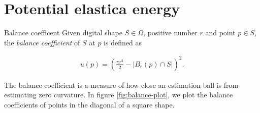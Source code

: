 \chapter{Potential elastica energy}
\label{chapter:appendix-potential-elastica-energy}

\begin{definition}{Balance coefficent}
Given digital shape $S \in \Omega$, positive number $r$ and point $p \in S$, the \emph{balance coefficient} of $S$ at $p$ is defined as

\begin{align*}
	u(p) = \left( \frac{\pi r^2}{2} - |B_r(p) \cap S| \right)^2.
\end{align*}

\end{definition}

The balance coefficient is a measure of how close an estimation ball is from estimating zero curvature. In figure \ref{fig:balance-plot}, we plot the balance coefficients of points in the diagonal of a square shape. 

